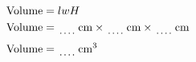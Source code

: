 \documentclass[12pt]{article}
\begin{document}
\hfill
\begin{minipage}{.5\textwidth}
  \begin{align*}
  \text{Volume} &= lwH \\
  \text{Volume} &= \dotuline{~~~~~} \,\text{cm} \times \dotuline{~~~~~} \,\text{cm} \times \dotuline{~~~~~} \,\text{cm} \\
  \text{Volume} &= \dotuline{~~~~~} \,\text{cm}^3
  \end{align*}
\end{minipage}
\par\vspace{1cm}
\end{document}
